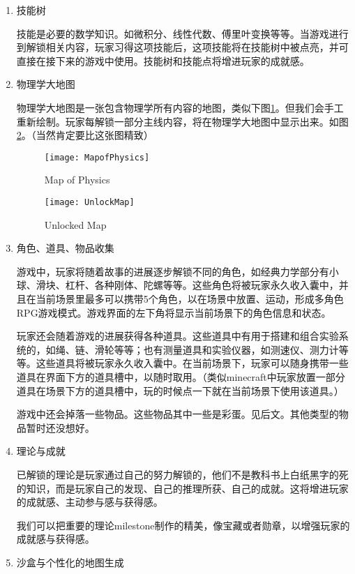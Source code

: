 \documentclass{tstextbook}
\begin{document}
\begin{enumerate}
\item{技能树}

技能是必要的数学知识。如微积分、线性代数、傅里叶变换等等。当游戏进行到解锁相关内容，玩家习得这项技能后，这项技能将在技能树中被点亮，并可直接在接下来的游戏中使用。技能树和技能点将增进玩家的成就感。

\item{物理学大地图}

物理学大地图是一张包含物理学所有内容的地图，类似下图\ref{Fig.map}。但我们会手工重新绘制。玩家每解锁一部分主线内容，将在物理学大地图中显示出来。如图\ref{mapUnlock}。（当然肯定要比这张图精致）

\begin{figure}[H]
\centering 
\texttt{[image: MapofPhysics]} 
\caption{Map of Physics} 
\label{Fig.map} 
\end{figure}

\begin{figure}[H]
\centering
\texttt{[image: UnlockMap]} 
\caption{Unlocked Map}
\label{mapUnlock} 
\end{figure}

\item{角色、道具、物品收集}

游戏中，玩家将随着故事的进展逐步解锁不同的角色，如经典力学部分有小球、滑块、杠杆、各种刚体、陀螺等等。这些角色将被玩家永久收入囊中，并且在当前场景里最多可以携带5个角色，以在场景中放置、运动，形成多角色RPG游戏模式。游戏界面的左下角将显示当前场景下的角色信息和状态。

玩家还会随着游戏的进展获得各种道具。这些道具中有用于搭建和组合实验系统的，如绳、链、滑轮等等；也有测量道具和实验仪器，如测速仪、测力计等等。这些道具将被玩家永久收入囊中。在当前场景下，玩家可以随身携带一些道具在界面下方的道具槽中，以随时取用。（类似minecraft中玩家放置一部分道具在场景下方的道具槽中，玩的时候点一下就在当前场景下使用该道具。）

游戏中还会掉落一些物品。这些物品其中一些是彩蛋。见后文。其他类型的物品暂时还没想好。


\item{理论与成就}

已解锁的理论是玩家通过自己的努力解锁的，他们不是教科书上白纸黑字的死的知识，而是玩家自己的发现、自己的推理所获、自己的成就。这将增进玩家的成就感、主动参与感与获得感。

我们可以把重要的理论milestone制作的精美，像宝藏或者勋章，以增强玩家的成就感与获得感。

\item{沙盒与个性化的地图生成}


\end{enumerate}
\end{document}
